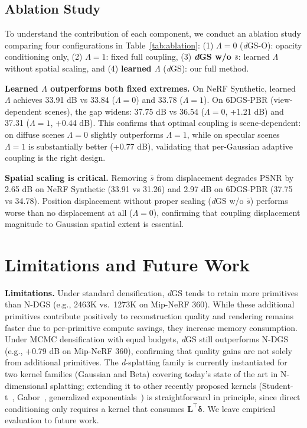 \documentclass{article}
\newcommand{\dgs}{\textit{d}GS\xspace}
\newcommand{\dfamily}{\textit{d}-splatting\xspace}
\theoremstyle{plain}
\theoremstyle{definition}
\theoremstyle{remark}
\begin{document}
\subsection{Ablation Study}

To understand the contribution of each component, we conduct an ablation study comparing four configurations in Table~\ref{tab:ablation}: (1) \textbf{$\Lambda{=}0$} (\textit{d}GS-O): opacity conditioning only, (2) \textbf{$\Lambda{=}1$}: fixed full coupling, (3) \textbf{\textit{d}GS w/o $\bar{s}$}: learned $\Lambda$ without spatial scaling, and (4) \textbf{learned $\Lambda$} (\textit{d}GS): our full method.

\textbf{Learned $\Lambda$ outperforms both fixed extremes.} On NeRF Synthetic, learned $\Lambda$ achieves 33.91 dB vs 33.84 ($\Lambda{=}0$) and 33.78 ($\Lambda{=}1$). On 6DGS-PBR (view-dependent scenes), the gap widens: 37.75 dB vs 36.54 ($\Lambda{=}0$, +1.21 dB) and 37.31 ($\Lambda{=}1$, +0.44 dB). This confirms that optimal coupling is scene-dependent: on diffuse scenes $\Lambda{=}0$ slightly outperforms $\Lambda{=}1$, while on specular scenes $\Lambda{=}1$ is substantially better (+0.77 dB), validating that per-Gaussian adaptive coupling is the right design.

\textbf{Spatial scaling is critical.} Removing $\bar{s}$ from displacement degrades PSNR by 2.65 dB on NeRF Synthetic (33.91 vs 31.26) and 2.97 dB on 6DGS-PBR (37.75 vs 34.78). Position displacement without proper scaling (\textit{d}GS w/o $\bar{s}$) performs worse than no displacement at all ($\Lambda{=}0$), confirming that coupling displacement magnitude to Gaussian spatial extent is essential.

\section{Limitations and Future Work}

\textbf{Limitations.} Under standard densification, \dgs{} tends to retain more primitives than N-DGS (e.g., 2463K vs.\ 1273K on Mip-NeRF 360). While these additional primitives contribute positively to reconstruction quality and rendering remains faster due to per-primitive compute savings, they increase memory consumption. Under MCMC densification with equal budgets, \dgs{} still outperforms N-DGS (e.g., +0.79 dB on Mip-NeRF 360), confirming that quality gains are not solely from additional primitives. The \dfamily{} family is currently instantiated for two kernel families (Gaussian and Beta) covering today's state of the art in N-dimensional splatting; extending it to other recently proposed kernels (Student-t~\citep{zhu20253dstudentsplattingscooping}, Gabor~\citep{zhou20253dgabsplat3dgaborsplatting}, generalized exponentials~\citep{hamdi2024gesgeneralizedexponentialsplatting}) is straightforward in principle, since direct conditioning only requires a kernel that consumes $\mathbf{L}^\top\boldsymbol{\delta}$. We leave empirical evaluation to future work.
\end{document}
